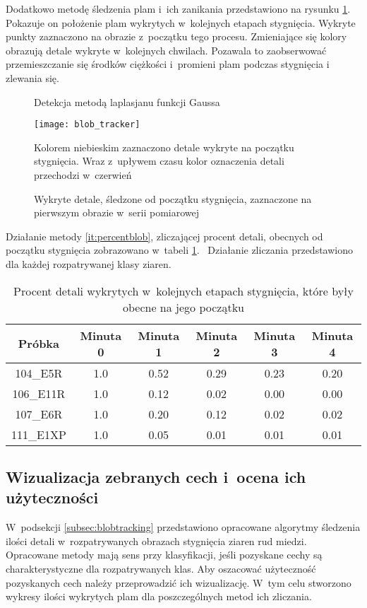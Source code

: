 Dodatkowo metodę śledzenia plam i~ich zanikania przedstawiono na rysunku
\ref{fig:blobremain}.
Pokazuje on położenie plam wykrytych w~kolejnych etapach stygnięcia.
Wykryte punkty zaznaczono na obrazie z~początku tego procesu.
Zmieniające się kolory obrazują detale wykryte w~kolejnych chwilach.
Pozawala to zaobserwować przemieszczanie się środków ciężkości i~promieni
plam podczas stygnięcia i zlewania się.
\begin{figure}[htb]
    \centering
    \caption*{\scriptsize Detekcja metodą laplasjanu funkcji Gaussa}
    \texttt{[image: blob\_tracker]}
    \vspace{0.3cm}
    \caption*{\scriptsize
        Kolorem niebieskim zaznaczono detale wykryte na początku stygnięcia.
        Wraz z~upływem czasu kolor oznaczenia detali przechodzi w~czerwień}
    \caption{Wykryte detale, śledzone od początku stygnięcia, zaznaczone na
             pierwszym obrazie w~serii pomiarowej}
    \label{fig:blobremain}
\end{figure}
Działanie metody \ref{it:percentblob}, zliczającej procent detali, obecnych
od początku stygnięcia zobrazowano w~tabeli \ref{tab:blobpercent}.~
Działanie zliczania przedstawiono dla każdej rozpatrywanej klasy ziaren.
\begin{table}[htb]
	\centering
	\begin{tabular}{c|c|c|c|c|c}
	\toprule
	Próbka & Minuta 0 & Minuta 1 & Minuta 2 & Minuta 3 & Minuta 4 \\ \midrule
	104\_E5R  & 1.0 & 0.52 & 0.29 & 0.23 & 0.20 \\
	106\_E11R & 1.0 & 0.12 & 0.02 & 0.00 & 0.00 \\
	107\_E6R  & 1.0 & 0.20 & 0.12 & 0.02 & 0.02 \\
	111\_E1XP & 1.0 & 0.05 & 0.01 & 0.01 & 0.01 \\
	\bottomrule
	\end{tabular}
\caption{Procent detali wykrytych w~kolejnych etapach stygnięcia, które
         były obecne na jego początku}
\label{tab:blobpercent}
\end{table}

\subsection{Wizualizacja zebranych cech i~ocena ich użyteczności}
\label{subsec:datavis}
W~podsekcji \ref{subsec:blobtracking} przedstawiono opracowane algorytmy
śledzenia ilości detali w~rozpatrywanych obrazach stygnięcia ziaren rud
miedzi.
Opracowane metody mają sens przy klasyfikacji, jeśli pozyskane cechy są
charakterystyczne dla rozpatrywanych klas.
Aby oszacować użyteczność pozyskanych cech należy przeprowadzić ich
wizualizację.
W~tym celu stworzono wykresy ilości wykrytych plam dla poszczególnych
metod ich zliczania.

